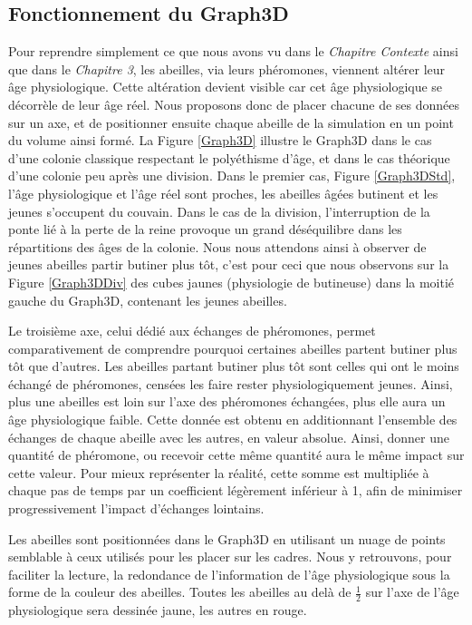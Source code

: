 		\subsection{Fonctionnement du Graph3D}
		
		Pour reprendre simplement ce que nous avons vu dans le \textit{Chapitre Contexte} ainsi que dans le \textit{Chapitre 3}, les abeilles, via leurs phéromones, viennent altérer leur âge physiologique. Cette altération devient visible car cet âge physiologique se décorrèle de leur âge réel. Nous proposons donc de placer chacune de ses données sur un axe, et de positionner ensuite chaque abeille de la simulation en un point du volume ainsi formé. La Figure \ref{Graph3D} illustre le Graph3D dans le cas d'une colonie classique respectant le polyéthisme d'âge, et dans le cas théorique d'une colonie peu après une division. Dans le premier cas, Figure \ref{Graph3DStd}, l'âge physiologique et l'âge réel sont proches, les abeilles âgées butinent et les jeunes s'occupent du couvain. Dans le cas de la division, l'interruption de la ponte lié à la perte de la reine provoque un grand déséquilibre dans les répartitions des âges de la colonie. Nous nous attendons ainsi à observer de jeunes abeilles partir butiner plus tôt, c'est pour ceci que nous observons sur la Figure \ref{Graph3DDiv} des cubes jaunes (physiologie de butineuse) dans la moitié gauche du Graph3D, contenant les jeunes abeilles.
		
		Le troisième axe, celui dédié aux échanges de phéromones, permet comparativement de comprendre pourquoi certaines abeilles partent butiner plus tôt que d'autres. Les abeilles partant butiner plus tôt sont celles qui ont le moins échangé de phéromones, censées les faire rester physiologiquement jeunes. Ainsi, plus une abeilles est loin sur l'axe des phéromones échangées, plus elle aura un âge physiologique faible. Cette donnée est obtenu en additionnant l'ensemble des échanges de chaque abeille avec les autres, en valeur absolue. Ainsi, donner une quantité de phéromone, ou recevoir cette même quantité aura le même impact sur cette valeur. Pour mieux représenter la réalité, cette somme est multipliée à chaque pas de temps par un coefficient légèrement inférieur à 1, afin de minimiser progressivement l'impact d'échanges lointains.
		
		Les abeilles sont positionnées dans le Graph3D en utilisant un nuage de points semblable à ceux utilisés pour les placer sur les cadres. Nous y retrouvons, pour faciliter la lecture, la redondance de l'information de l'âge physiologique sous la forme de la couleur des abeilles. Toutes les abeilles au delà de $\frac{1}{2}$ sur l'axe de l'âge physiologique sera dessinée jaune, les autres en rouge.
		
